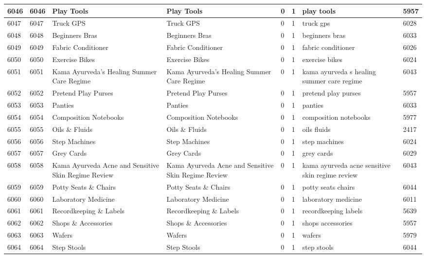 \begin{longtable}{|l|l|l|l|l|l|l|l|}
6046 & 6046 & Play Tools & Play Tools & 0 & 1 & play tools & 5957 \\ \hline 
6047 & 6047 & Truck GPS & Truck GPS & 0 & 1 & truck gps & 6028 \\ \hline 
6048 & 6048 & Beginners Bras & Beginners Bras & 0 & 1 & beginners bras & 6033 \\ \hline 
6049 & 6049 & Fabric Conditioner & Fabric Conditioner & 0 & 1 & fabric conditioner & 6026 \\ \hline 
6050 & 6050 & Exercise Bikes & Exercise Bikes & 0 & 1 & exercise bikes & 6024 \\ \hline 
6051 & 6051 & Kama Ayurveda's Healing Summer Care Regime & Kama Ayurveda's Healing Summer Care Regime & 0 & 1 & kama ayurveda s healing summer care regime & 6043 \\ \hline 
6052 & 6052 & Pretend Play Purses & Pretend Play Purses & 0 & 1 & pretend play purses & 5957 \\ \hline 
6053 & 6053 & Panties & Panties & 0 & 1 & panties & 6033 \\ \hline 
6054 & 6054 & Composition Notebooks & Composition Notebooks & 0 & 1 & composition notebooks & 5977 \\ \hline 
6055 & 6055 & Oils \& Fluids & Oils \& Fluids & 0 & 1 & oils fluids & 2417 \\ \hline 
6056 & 6056 & Step Machines & Step Machines & 0 & 1 & step machines & 6024 \\ \hline 
6057 & 6057 & Grey Cards & Grey Cards & 0 & 1 & grey cards & 6029 \\ \hline 
6058 & 6058 & Kama Ayurveda Acne and Sensitive Skin Regime Review & Kama Ayurveda Acne and Sensitive Skin Regime Review & 0 & 1 & kama ayurveda acne sensitive skin regime review & 6043 \\ \hline 
6059 & 6059 & Potty Seats \& Chairs & Potty Seats \& Chairs & 0 & 1 & potty seats chairs & 6044 \\ \hline 
6060 & 6060 & Laboratory Medicine & Laboratory Medicine & 0 & 1 & laboratory medicine & 6011 \\ \hline 
6061 & 6061 & Recordkeeping \& Labels & Recordkeeping \& Labels & 0 & 1 & recordkeeping labels & 5639 \\ \hline 
6062 & 6062 & Shops \& Accessories & Shops \& Accessories & 0 & 1 & shops accessories & 5957 \\ \hline 
6063 & 6063 & Wafers & Wafers & 0 & 1 & wafers & 5979 \\ \hline 
6064 & 6064 & Step Stools & Step Stools & 0 & 1 & step stools & 6044 \\ \hline 

\end{longtable}
